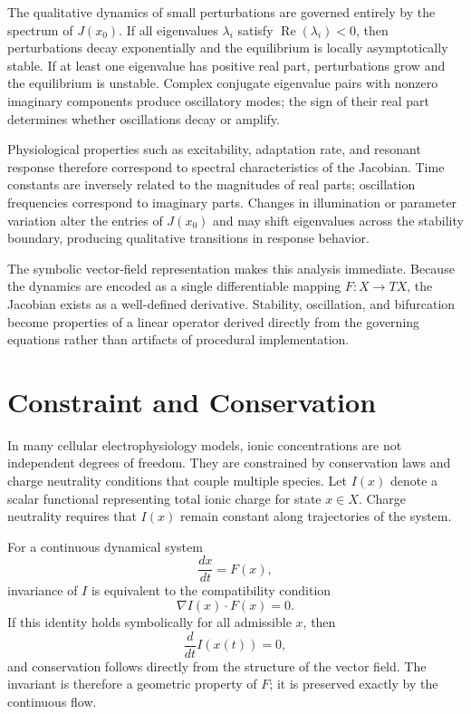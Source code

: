 \documentclass[12pt]{book}
\begin{document}
The qualitative dynamics of small perturbations are governed entirely by
the spectrum of $J(x_0)$. If all eigenvalues $\lambda_i$ satisfy
$\operatorname{Re}(\lambda_i) < 0$, then perturbations decay
exponentially and the equilibrium is locally asymptotically stable.
If at least one eigenvalue has positive real part, perturbations grow
and the equilibrium is unstable. Complex conjugate eigenvalue pairs
with nonzero imaginary components produce oscillatory modes; the sign
of their real part determines whether oscillations decay or amplify.

Physiological properties such as excitability, adaptation rate, and
resonant response therefore correspond to spectral characteristics of
the Jacobian. Time constants are inversely related to the magnitudes
of real parts; oscillation frequencies correspond to imaginary parts.
Changes in illumination or parameter variation alter the entries of
$J(x_0)$ and may shift eigenvalues across the stability boundary,
producing qualitative transitions in response behavior.

The symbolic vector-field representation makes this analysis immediate.
Because the dynamics are encoded as a single differentiable mapping
$F : X \to TX$, the Jacobian exists as a well-defined derivative.
Stability, oscillation, and bifurcation become properties of a
linear operator derived directly from the governing equations rather
than artifacts of procedural implementation.

\section{Constraint and Conservation}

In many cellular electrophysiology models, ionic concentrations are not
independent degrees of freedom. They are constrained by conservation laws
and charge neutrality conditions that couple multiple species. Let
$I(x)$ denote a scalar functional representing total ionic charge for
state $x \in X$. Charge neutrality requires that $I(x)$ remain constant
along trajectories of the system.

For a continuous dynamical system
\[
\frac{dx}{dt} = F(x),
\]
invariance of $I$ is equivalent to the compatibility condition
\[
\nabla I(x) \cdot F(x) = 0.
\]
If this identity holds symbolically for all admissible $x$, then
\[
\frac{d}{dt} I(x(t)) = 0,
\]
and conservation follows directly from the structure of the vector field.
The invariant is therefore a geometric property of $F$; it is preserved
exactly by the continuous flow.
\end{document}
